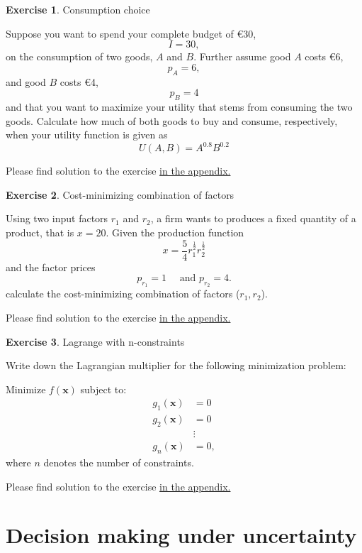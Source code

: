 \documentclass[
  12pt,
  oneside]{book}
\theoremstyle{definition}
\theoremstyle{definition}
\theoremstyle{definition}
\newtheorem{exercise}{Exercise}[chapter]
\theoremstyle{definition}
\theoremstyle{remark}
\begin{document}
\begin{exercise}
\protect\hypertarget{exr:cchoice}{}\label{exr:cchoice}Consumption choice

Suppose you want to spend your complete budget of €30, \[I=30,\] on the
consumption of two goods, \(A\) and \(B\). Further assume good \(A\) costs €6, \[p_A=6,\]
and good \(B\) costs €4, \[p_B=4\] and that you want to maximize your utility that
stems from consuming the two goods.
Calculate how much of both goods to buy and consume, respectively, when your utility function
is given as \[U(A,B)=A^{0.8}B^{0.2}\]

Please find solution to the exercise \hyperref[sol:cchoice]{in the appendix.}
\end{exercise}

\begin{exercise}
\protect\hypertarget{exr:costmin}{}\label{exr:costmin}Cost-minimizing combination of factors

Using two input factors \(r_1\) and \(r_2\), a firm wants to produces a fixed quantity of a product, that is \(x=20\). Given the production function
\[
    x=\frac{5}{4} r_1^{\frac{1}{2}} r_2^{\frac{1}{2}}
    \] and the factor prices
\[
    p_{r_1}=1 \quad \text{ and } p_{r_2}=4.
    \]
calculate the cost-minimizing combination of factors (\(r_1, r_2\)).

Please find solution to the exercise \hyperref[sol:costmin]{in the appendix.}
\end{exercise}

\begin{exercise}
\protect\hypertarget{exr:lagrcons}{}\label{exr:lagrcons}Lagrange with n-constraints

Write down the Lagrangian multiplier for the following minimization problem:

Minimize \(f(\mathbf{x})\) subject to:
\[\begin{aligned}
    g_1(\mathbf{x})&=0 \\
    g_2(\mathbf{x})&=0\\
    &\vdots\\
    g_n(\mathbf{x})&=0,\end{aligned}\]
where \(n\) denotes the number of constraints.
\end{exercise}

Please find solution to the exercise \hyperref[sol:lagrcons]{in the appendix.}

\section{Decision making under uncertainty}\label{decision-making-under-uncertainty}
\end{document}
